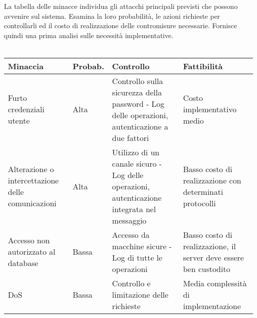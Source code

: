 \clearpage

La tabella delle minacce individua gli attacchi principali previsti che possono avvenire sul sistema. 
Esamina la loro probabilità, le azioni richieste per controllarli ed il costo di realizzazione delle contromisure necessarie.
Fornisce quindi una prima analisi sulle necessità implementative.\\
\\

\begin{table}[htbp]
    \centering
    \begin{tabular} {|P{3cm}|P{2cm}|P{6.1cm}|P{4cm}|}
        \hline
        \textbf{Minaccia}                                 & \textbf{Probab.} & \textbf{Controllo}                                                                                                                                                                                                                      & \textbf{Fattibilità}                                              \\
        \hline
        Furto credenziali utente                          & Alta             & Controllo sulla sicurezza della password - Log delle operazioni, autenticazione a due fattori                                                                                                                                           & Costo implementativo medio                                        \\
        \hline
        Alterazione o intercettazione delle comunicazioni & Alta             & Utilizzo di un canale sicuro - Log delle operazioni, autenticazione integrata nel messaggio                                                                                                                                             & Basso costo di realizzazione con determinati protocolli           \\
        \hline
        Accesso non autorizzato al database               & Bassa            & Accesso da macchine sicure - Log di tutte le operazioni                                                                                                                                                                                 & Basso costo di realizzazione, il server deve essere ben custodito \\
        \hline
        DoS                                               & Bassa            & Controllo e limitazione delle richieste                                                                                                                                                                                                 & Media complessità di implementazione                              \\

\end{tabular}
\end{table}
